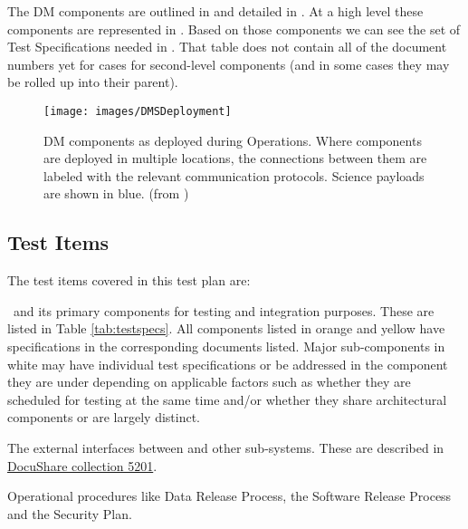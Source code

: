  The DM components are  outlined in  and detailed in . At a high level these components are represented in .  Based on those components we can see the set of Test Specifications needed in . That table does not contain all of the document numbers yet for cases for second-level components (and in some cases they may be rolled up into their parent).


\begin{figure}[htbp]
	\begin{center}
		\texttt{[image: images/DMSDeployment]}
		\caption{DM components as deployed during Operations. Where components are
			deployed in multiple locations, the connections between them are labeled with
			the relevant communication protocols. Science payloads are shown in blue.
		\label{fig:dmsdeploy} (from )}
	\end{center}
\end{figure}

\subsection{Test Items}

\begin{table}
	\caption{Components from LDM-148 with the test specifications to verify them. \label{tab:testspecs}}
	
\end{table}

The test items covered in this test plan are:

\begin{itemize_single}
\item \product\ and its primary components for testing and integration purposes. These are listed in Table \ref{tab:testspecs}. All components listed in orange and yellow have specifications in the corresponding documents listed. Major sub-components in white may have individual test specifications or be addressed in the component they are under depending on applicable factors such as whether they are scheduled for testing at the same time and/or whether they share architectural components or are largely distinct.

\item The external interfaces between \product and other sub-systems. These are described in \href{https://ls.st/Collection-5201}{DocuShare collection 5201}.

\item Operational procedures like Data Release Process, the Software Release Process and the Security Plan.

\end{itemize_single}


